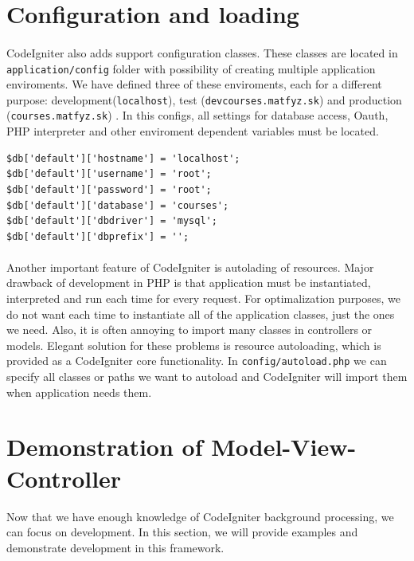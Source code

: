 \section{Configuration and loading}
\paragraph{}
CodeIgniter also adds support configuration classes. These classes are located in \texttt{application/config} folder with possibility of creating multiple application enviroments. We have defined three of these enviroments, each for a different purpose: development(\texttt{localhost}), test (\texttt{devcourses.matfyz.sk}) and production (\texttt{courses.matfyz.sk}) . In this configs, all settings for database access, Oauth, PHP interpreter and other enviroment dependent variables must be located. 

\begin{lstlisting}[basicstyle=\small,caption={Database configuration for development enviroment}]
$db['default']['hostname'] = 'localhost';
$db['default']['username'] = 'root';
$db['default']['password'] = 'root';
$db['default']['database'] = 'courses';
$db['default']['dbdriver'] = 'mysql';
$db['default']['dbprefix'] = '';
\end{lstlisting}

\paragraph{}
Another important feature of CodeIgniter is autolading of resources. Major drawback of development in PHP is that application must be instantiated, interpreted and run each time for every request. For optimalization purposes, we do not want each time to instantiate all of the application classes, just the ones we need. Also, it is often annoying to import many classes in controllers or models. Elegant solution for these problems is resource autoloading, which is provided as a CodeIgniter core functionality. In \texttt{config/autoload.php} we can specify all classes or paths we want to autoload and CodeIgniter will import them when application needs them.


\section{Demonstration of Model-View-Controller}
Now that we have enough knowledge of CodeIgniter background processing, we can focus on development. In this section, we will provide examples and demonstrate development in this framework.

